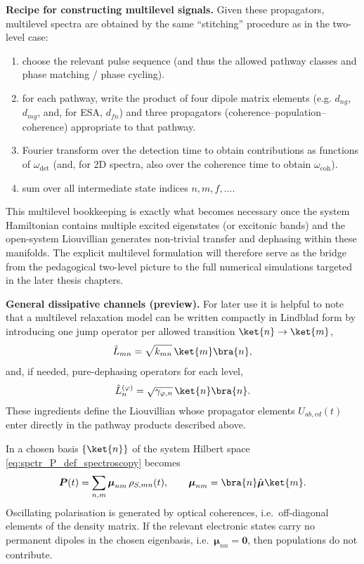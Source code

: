 \medskip

\textbf{Recipe for constructing multilevel signals.}
Given these propagators, multilevel spectra are obtained by the same ``stitching'' procedure as in the two-level case:
\begin{enumerate}
	\item choose the relevant pulse sequence (and thus the allowed pathway classes and phase matching / phase cycling).
	\item for each pathway, write the product of four dipole matrix elements (e.g. $d_{ng}$, $d_{mg}$, and, for ESA, $d_{fn}$) and three propagators (coherence--population--coherence) appropriate to that pathway.
	\item Fourier transform over the detection time to obtain contributions as functions of $\omega_{\mathrm{det}}$ (and, for 2D spectra, also over the coherence time to obtain $\omega_{\mathrm{coh}}$).
	\item sum over all intermediate state indices $n,m,f,\dots$.
\end{enumerate}


This multilevel bookkeeping is exactly what becomes necessary once the system Hamiltonian contains multiple excited eigenstates (or excitonic bands) and the open-system Liouvillian generates non-trivial transfer and dephasing within these manifolds. The explicit multilevel formulation will therefore serve as the bridge from the pedagogical two-level picture to the full numerical simulations targeted in the later thesis chapters.

\medskip

\textbf{General dissipative channels (preview).}
For later use it is helpful to note that a multilevel relaxation model can be written compactly in Lindblad form by introducing one jump operator per allowed transition $\ket{n}\to\ket{m}$,
\begin{equation*}
	\hat{L}_{mn} = \sqrt{k_{mn}}\,\ket{m}\bra{n},
\end{equation*}
and, if needed, pure-dephasing operators for each level,
\begin{equation*}
	\hat{L}_{n}^{(\varphi)} = \sqrt{\gamma_{\varphi,n}}\,\ket{n}\bra{n}.
\end{equation*}
These ingredients define the Liouvillian whose propagator elements $U_{ab,cd}(t)$ enter directly in the pathway products described above.

In a chosen basis $\{\ket{n}\}$ of the system Hilbert space \autoref{eq:spctr_P_def_spectroscopy} becomes 
\begin{equation*}
	\boldsymbol{P}(t)=\sum_{n,m}
	\boldsymbol{\mu}_{nm}\,\rho_{S,mn}(t),
	\qquad
	\boldsymbol{\mu}_{nm}=\bra{n}\hat{\boldsymbol{\mu}}\ket{m}.
\end{equation*}
Oscillating polarisation is generated by optical coherences, i.e.\ off-diagonal elements of the density matrix. If the relevant electronic states carry no permanent dipoles in the chosen eigenbasis, i.e.\ $\boldsymbol{\mu}_{nn}=\boldsymbol{0}$, then populations do not contribute.

